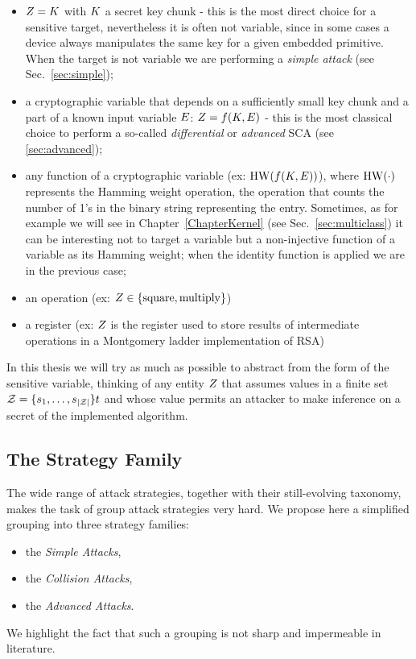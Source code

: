 \begin{itemize}
\item $Z = K$ with $K$ a secret key chunk - this is the most direct choice for a sensitive target, nevertheless it is often not variable, since in some cases a device always manipulates the same key for a given embedded primitive. When the target is not variable we are performing a \emph{simple attack} (see Sec.~\ref{sec:simple});
\item a cryptographic variable that depends on a sufficiently small key chunk and a part of a known input variable $E$: $Z = f(K,E)$ - this is the most classical choice to perform a so-called \emph{differential} or \emph{advanced} SCA (see \ref{sec:advanced});
\item any function of a cryptographic variable (ex: $\mathrm{HW}(f(K,E))$), where $\mathrm{HW}(\cdot)$ represents the Hamming weight operation, \ie the operation that counts the number of 1's in the binary string representing the entry. Sometimes, as for example we will see in Chapter~\ref{ChapterKernel} (see Sec.~\ref{sec:multiclass}) it can be interesting not to target a variable but a non-injective function of a variable as its Hamming weight; when the identity function is applied we are in the previous case;
\item an operation (ex: $Z \in \{\mathrm{square}, \mathrm{multiply}\}$)
\item a register (ex: $Z$ is the register used to store results of intermediate operations in a Montgomery ladder implementation of RSA)
\end{itemize}
In this thesis we will try as much as possible to abstract from the form of the sensitive variable, thinking of any entity $Z$ that assumes values in a finite set $\mathcal{Z}=\{s_{1}, \dots, s_{\lvert\mathcal{Z}\rvert}\}t$ and whose value permits an attacker to make inference on a secret of the implemented algorithm.

\subsection{The Strategy Family}\label{sec:strategies}
The wide range of attack strategies, together with their still-evolving taxonomy, makes the task of group attack strategies very hard. We propose here a simplified grouping into three strategy families: 
\begin{itemize}
\item  the \emph{Simple Attacks},
\item the \emph{Collision Attacks}, 
\item the \emph{Advanced Attacks}.
\end{itemize}  
We highlight the fact that such a grouping is not sharp and impermeable in literature. 


